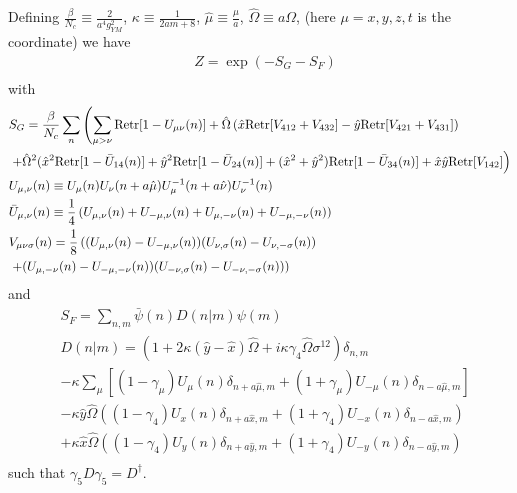 Defining $\frac{\beta}{N_c} \equiv \frac{2}{a^4g_{YM}^2}$, $\kappa \equiv \frac{1}{2am+8}$, $\hat{\mu}\equiv \frac{\mu}{a}$, $\hat{\Omega}\equiv a\Omega$, (here $\mu=x,y,z,t$ is the coordinate) we have
\begin{equation}
\begin{split}
&Z=\exp (-S_G-S_F)\\
\end{split}
\end{equation}
with
\textcolor[rgb]{0,0,0.8}{
\begin{equation}
\begin{split}
&S_G=\frac{\beta}{N_c}\sum _{n}\left(\sum _{\mu >\nu}{\rm Retr}[1-U_{\mu\nu}(n)]+\hat{\Omega}\left(\hat{x}{\rm Retr}[V_{412}+V_{432}]-\hat{y}{\rm Retr}[V_{421}+V_{431}]\right)\right.\\
&\left.+\hat{\Omega}^2(\hat{x}^2{\rm Retr}[1-\bar{U}_{14}(n)]+\hat{y}^2{\rm Retr}[1-\bar{U}_{24}(n)]+(\hat{x}^2+\hat{y}^2){\rm Retr}[1-\bar{U}_{34}(n)]+\hat{x}\hat{y}{\rm Retr}[V_{142}]\right)\\
&U_{\mu, \nu}(n)\equiv U_{\mu}(n)U_{\nu}(n+a\hat{\mu})U^{-1}_{\mu}(n+a\hat{\nu})U^{-1}_{\nu}(n)\\
&\bar{U}_{\mu, \nu}(n)\equiv \frac{1}{4}\left(U_{\mu, \nu}(n)+U_{-\mu ,\nu}(n)+U_{\mu, -\nu}(n)+U_{-\mu, -\nu}(n)\right)\\
&V_{\mu\nu\sigma}(n)=\frac{1}{8}\left((U_{\mu,\nu}(n)-U_{-\mu,\nu}(n))(U_{\nu,\sigma}(n)-U_{\nu,-\sigma}(n))\right.\\
&\left.+(U_{\mu,-\nu}(n)-U_{-\mu,-\nu}(n))(U_{-\nu,\sigma}(n)-U_{-\nu,-\sigma}(n))\right)\\
\end{split}
\end{equation}
}
and
\textcolor[rgb]{0,0,0.8}{
\begin{equation}
\begin{split}
&S_F=\sum _{n,m}\bar{\psi }(n) D(n|m) \psi(m)\\
&D(n|m)=\left(1+2\kappa(\hat{y}-\hat{x})\hat{\Omega}+i\kappa \gamma _4 \hat{\Omega} \sigma ^{12}\right)\delta _{n,m}\\
&-\kappa\sum _{\mu}\left[(1-\gamma _{\mu})U_{\mu}(n)\delta _{n+a\hat{\mu},m}+(1+\gamma _{\mu})U_{-\mu}(n)\delta _{n-a\hat{\mu},m}\right]\\
&-\kappa \hat{y}\hat{\Omega} \left((1-\gamma _4)U_{x}(n)\delta _{n+a\hat{x},m}+(1+\gamma _4)U_{-x}(n)\delta _{n-a\hat{x},m}\right)\\
&+\kappa \hat{x}\hat{\Omega} \left((1-\gamma _4)U_{y}(n)\delta _{n+a\hat{y},m}+(1+\gamma _4)U_{-y}(n)\delta _{n-a\hat{y},m}\right)\\
\end{split}
\end{equation}
}
such that $\gamma _5 D \gamma _5=D^{\dagger}$.

